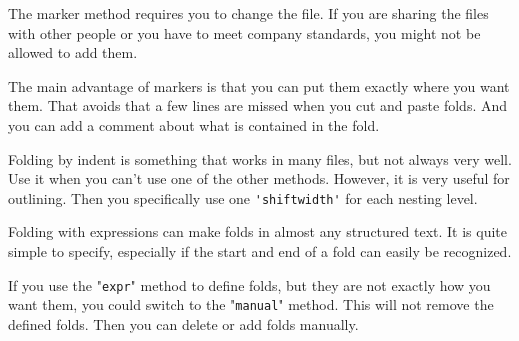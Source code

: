 The marker method requires you to change the file.
If you are sharing the files with other people or you have to meet company standards, you might not be allowed to add them.

The main advantage of markers is that you can put them exactly where you want them.
That avoids that a few lines are missed when you cut and paste folds.
And you can add a comment about what is contained in the fold.

Folding by indent is something that works in many files, but not always very well.
Use it when you can't use one of the other methods.
However, it is very useful for outlining.
Then you specifically use one \verb!'shiftwidth'! for each nesting level.

Folding with expressions can make folds in almost any structured text.
It is quite simple to specify, especially if the start and end of a fold can easily be recognized.

If you use the "\verb!expr!" method to define folds, but they are not exactly how you want them, you could switch to the "\verb!manual!" method.
This will not remove the defined folds.
Then you can delete or add folds manually.
\clearpage
